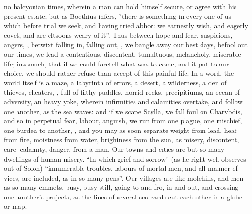 no halcyonian times, wherein a man can hold himself secure, or agree with his
present estate; but as Boethius infers, \enquote{there is
something in every one of us which before trial we seek, and having tried
abhor: we earnestly wish, and eagerly covet, and are
eftsoons weary of it}. Thus between hope and fear, suspicions, angers,
,
betwixt falling in, falling out, \etc{}, we bangle away our best days, befool
out our times, we lead a contentious, discontent, tumultuous, melancholy,
miserable life; insomuch, that if we could foretell what was to come, and it
put to our choice, we should rather refuse than accept of this painful life. In
a word, the world itself is a maze, a labyrinth of errors, a desert, a
wilderness, a den of thieves, cheaters, \etc{}, full of filthy puddles, horrid
rocks, precipitiums, an ocean of adversity, an heavy yoke, wherein infirmities
and calamities overtake, and follow one another, as the sea waves; and if we
scape Scylla, we fall foul on Charybdis, and so in perpetual fear, labour,
anguish, we run from one plague, one mischief, one burden to another, , and you may as soon separate weight from lead, heat
from fire, moistness from water, brightness from the sun, as misery,
discontent, care, calamity, danger, from a man. Our towns and cities are but so
many dwellings of human misery. \enquote{In which grief and sorrow}
(as he right well observes out of Solon) \enquote{innumerable
troubles, labours of mortal men, and all manner of vices, are included, as in
so many pens}. Our villages are like molehills, and men as so many emmets,
busy, busy still, going to and fro, in and out, and crossing one another's
projects, as the lines of several sea-cards cut each other in a globe or map.
